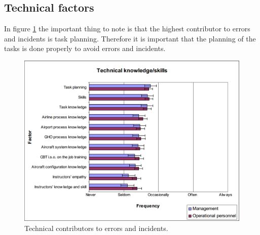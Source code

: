 \newpage
\subsection{Technical factors}
In figure \ref{TechnicalFactors} the important thing to note is that the highest contributor to errors and incidents is task planning. Therefore it is important that the planning of the tasks is done properly to avoid errors and incidents.

\begin{figure}[H]
\centering
\includegraphics[width=\textwidth]{Grafik/TechnicalFactors}
\caption{Technical contributors to errors and incidents.}
\label{TechnicalFactors}
\end{figure}
